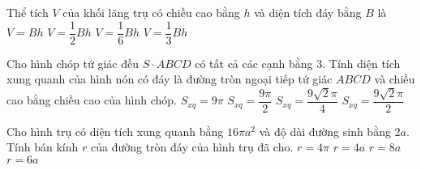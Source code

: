 \begin{ex}%
	Thể tích $V$ của khối lăng trụ có chiều cao bằng $h$ và diện tích đáy bằng $B$ là
	\choice
	{\True $V = Bh$}
	{$V = \dfrac{1}{2}Bh$}
	{$V = \dfrac{1}{6}Bh$}
	{$V = \dfrac{1}{3}Bh$}
\end{ex}


\begin{ex}%
	Cho hình chóp tứ giác đều $S\cdot ABCD$ có tất cả các cạnh bằng $3$. Tính diện tích xung quanh của hình nón có đáy là đường tròn ngoại tiếp tứ giác $ABCD$ và chiều cao bằng chiều cao của hình chóp.
	\choice
	{${S_{xq}} = 9\pi $}
	{${S_{xq}} = \dfrac{9\pi}{2}$}
	{${S_{xq}} = \dfrac{9\sqrt 2 \pi}{4}$}
	{\True ${S_{xq}} = \dfrac{9\sqrt 2 \pi}{2}$}
\end{ex}


\begin{ex}%
	Cho hình trụ có diện tích xung quanh bằng $16\pi a^2$ và độ dài đường sinh bằng $2a$. Tính bán kính $r$ của đường tròn đáy của hình trụ đã cho.
	\choice
	{$r = 4\pi $}
	{\True $r = 4a$}
	{$r = 8a$}
	{$r = 6a$}
\end{ex}


